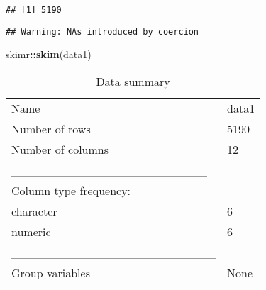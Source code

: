 \documentclass[
]{article}
\newenvironment{Shaded}{\begin{snugshade}}{\end{snugshade}}
\newcommand{\AttributeTok}[1]{\textcolor[rgb]{0.13,0.29,0.53}{#1}}
\newcommand{\DecValTok}[1]{\textcolor[rgb]{0.00,0.00,0.81}{#1}}
\newcommand{\FunctionTok}[1]{\textcolor[rgb]{0.13,0.29,0.53}{\textbf{#1}}}
\newcommand{\NormalTok}[1]{#1}
\newcommand{\OtherTok}[1]{\textcolor[rgb]{0.56,0.35,0.01}{#1}}
\newcommand{\SpecialCharTok}[1]{\textcolor[rgb]{0.81,0.36,0.00}{\textbf{#1}}}
\begin{document}
\begin{verbatim}
## [1] 5190
\end{verbatim}

\begin{Shaded}
\end{Shaded}

\begin{verbatim}
## Warning: NAs introduced by coercion
\end{verbatim}

\begin{Shaded}
\end{Shaded}

\begin{Shaded}
\begin{Highlighting}[]
\NormalTok{skimr}\SpecialCharTok{::}\FunctionTok{skim}\NormalTok{(data1)}
\end{Highlighting}
\end{Shaded}

\begin{longtable}[]{@{}ll@{}}
\caption{Data summary}\tabularnewline
\toprule\noalign{}
\endfirsthead
\endhead
\bottomrule\noalign{}
\endlastfoot
Name & data1 \\
Number of rows & 5190 \\
Number of columns & 12 \\
\_\_\_\_\_\_\_\_\_\_\_\_\_\_\_\_\_\_\_\_\_\_\_ & \\
Column type frequency: & \\
character & 6 \\
numeric & 6 \\
\_\_\_\_\_\_\_\_\_\_\_\_\_\_\_\_\_\_\_\_\_\_\_\_ & \\
Group variables & None \\
\end{longtable}
\end{document}
